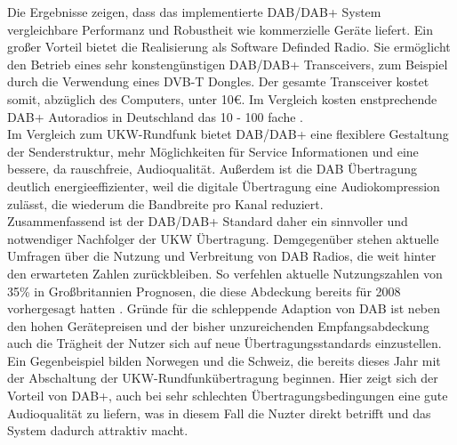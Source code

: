 Die Ergebnisse zeigen, dass das implementierte DAB/DAB+ System vergleichbare Performanz und Robustheit wie kommerzielle Geräte liefert. Ein großer Vorteil bietet die Realisierung als Software Definded Radio. Sie ermöglicht den Betrieb eines sehr konstengünstigen DAB/DAB+ Transceivers, zum Beispiel durch die Verwendung eines DVB-T Dongles. Der gesamte Transceiver kostet somit, abzüglich des Computers, unter 10\euro. Im Vergleich kosten enstprechende DAB+ Autoradios in Deutschland das 10 - 100 fache \cite{web:dab_im_auto}.\\

Im Vergleich zum UKW-Rundfunk bietet DAB/DAB+ eine flexiblere Gestaltung der Senderstruktur, mehr Möglichkeiten für Service Informationen und eine bessere, da rauschfreie, Audioqualität. Außerdem ist die DAB Übertragung deutlich energieeffizienter, weil die digitale Übertragung eine Audiokompression zulässt, die wiederum die Bandbreite pro Kanal reduziert.\\
Zusammenfassend ist der DAB/DAB+ Standard daher ein sinnvoller und notwendiger Nachfolger der UKW Übertragung. Demgegenüber stehen aktuelle Umfragen über die Nutzung und Verbreitung von DAB Radios, die weit hinter den erwarteten Zahlen zurückbleiben. So verfehlen aktuelle Nutzungszahlen von 35\% \cite{web:dab_in_uk} in Großbritannien Prognosen, die diese Abdeckung bereits für 2008 vorhergesagt hatten \cite{dab:ausblick}. Gründe für die schleppende Adaption von DAB ist neben den hohen Gerätepreisen und der bisher unzureichenden Empfangsabdeckung auch die Trägheit der Nutzer sich auf neue Übertragungsstandards einzustellen. Ein Gegenbeispiel bilden Norwegen und die Schweiz, die bereits dieses Jahr mit der Abschaltung der UKW-Rundfunkübertragung beginnen. Hier zeigt sich der Vorteil von DAB+, auch bei sehr schlechten Übertragungsbedingungen eine gute Audioqualität zu liefern, was in diesem Fall die Nuzter direkt betrifft und das System dadurch attraktiv macht.